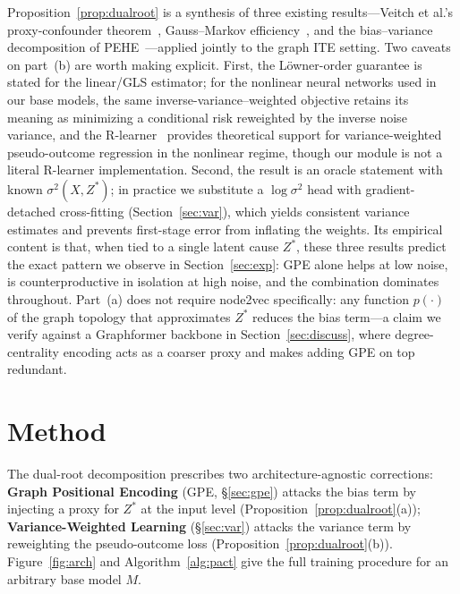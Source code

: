 \documentclass[sigconf,anonymous,review]{acmart}
\begin{document}
Proposition~\ref{prop:dualroot} is a synthesis of three existing results---Veitch et al.'s proxy-confounder theorem~\cite{veitch2019using}, Gauss--Markov efficiency~\cite{Aitken_1936}, and the bias--variance decomposition of PEHE~\cite{shalit2017estimating}---applied jointly to the graph ITE setting. Two caveats on part~(b) are worth making explicit. First, the Löwner-order guarantee is stated for the linear/GLS estimator; for the nonlinear neural networks used in our base models, the same inverse-variance--weighted objective retains its meaning as minimizing a conditional risk reweighted by the inverse noise variance, and the R-learner~\cite{nie2021rlearner} provides theoretical support for variance-weighted pseudo-outcome regression in the nonlinear regime, though our module is not a literal R-learner implementation. Second, the result is an oracle statement with known $\sigma^2(X, Z^*)$; in practice we substitute a $\log\sigma^2$ head with gradient-detached cross-fitting (Section~\ref{sec:var}), which yields consistent variance estimates and prevents first-stage error from inflating the weights. Its empirical content is that, when tied to a single latent cause $Z^*$, these three results predict the exact pattern we observe in Section~\ref{sec:exp}: GPE alone helps at low noise, is counterproductive in isolation at high noise, and the combination dominates throughout. Part~(a) does not require node2vec specifically: any function $p(\cdot)$ of the graph topology that approximates $Z^*$ reduces the bias term---a claim we verify against a Graphformer backbone in Section~\ref{sec:discuss}, where degree-centrality encoding acts as a coarser proxy and makes adding GPE on top redundant.

\section{Method}\label{sec:method}

The dual-root decomposition prescribes two architecture-agnostic corrections: \textbf{Graph Positional Encoding} (GPE, §\ref{sec:gpe}) attacks the bias term by injecting a proxy for $Z^*$ at the input level (Proposition~\ref{prop:dualroot}(a)); \textbf{Variance-Weighted Learning} (§\ref{sec:var}) attacks the variance term by reweighting the pseudo-outcome loss (Proposition~\ref{prop:dualroot}(b)). Figure~\ref{fig:arch} and Algorithm~\ref{alg:pact} give the full training procedure for an arbitrary base model $M$.
\end{document}
